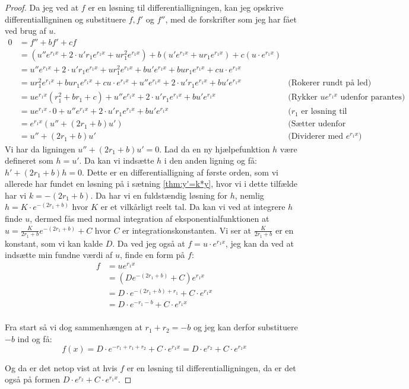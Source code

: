 \begin{proof}
Da jeg ved at $f$ er en løsning til differentialligningen, kan jeg opskrive differentialligninen og substituere $f, f'$ og $f''$, med de forskrifter som jeg har fået ved brug af $u$. 
\begin{align*}
0 	&= f'' + bf' + cf \\
	&= (u''e^{r_1 x} + 2\cdot u' r_1 e^{r_1 x} + u r_1^2 e^{r_1 x}) + b(u'e^{r_1 x} + ur_1 e^{r_1 x}) + c (u \cdot e^{r_1 x})\\
	&= u''e^{r_1 x} + 2\cdot u' r_1 e^{r_1 x} + u r_1^2 e^{r_1 x} + bu'e^{r_1 x} + bur_1 e^{r_1 x} + cu \cdot e^{r_1 x}\\
	&= u r_1^2 e^{r_1 x} + bur_1 e^{r_1 x} + cu \cdot e^{r_1 x} + u''e^{r_1 x} + 2\cdot u' r_1 e^{r_1 x} + bu'e^{r_1 x}  & \text{(Rokerer rundt på led)}\\
	&= ue^{r_1 x}(r_1^2  + br_1 + c) + u''e^{r_1 x} + 2\cdot u' r_1 e^{r_1 x} + bu'e^{r_1 x} & \text{(Rykker $ue^{r_1 x}$ udenfor  parantes)}\\
	&= ue^{r_1 x} \cdot 0+ u''e^{r_1 x} + 2\cdot u' r_1 e^{r_1 x} + bu'e^{r_1 x} & \text{($r_1$ er løsning til karakterligningen)}\\
	&= e^{r_1 x} (u'' + (2r_1 + b)u') & \text{(Sætter udenfor parantes)}\\
	&= u'' + (2r_1 + b)u' & \text{(Dividerer med $e^{r_1 x}$)}
\end{align*}
Vi har da ligningen $u'' + (2r_1 + b)u' = 0$. 
Lad da en ny hjælpefunktion $h$ være defineret som $h = u'$. 
Da kan vi indsætte $h$ i den anden ligning og få:
$h' + (2r_1 + b)h = 0$. 
Dette er en differentialligning af første orden, som vi allerede har fundet en løsning på i sætning \ref{thm:y'=k*y}, 
hvor vi i dette tilfælde har vi $k = -(2r_1 + b)$.
Da har vi en fuldstændig løsning for $h$, nemlig $h=K \cdot e^{-(2r_1 + b)}$ hvor $K$ er et vilkårligt reelt tal. 
Da kan vi ved at integrere $h$ finde $u$, dermed fås med normal integration af eksponentialfunktionen at $u = \frac{K}{2r_1 + b} e^{-(2r_1 + b)} + C$ hvor $C$ er integrationskonstanten. 
Vi ser at $\frac{K}{2r_1 + b}$ er en konstant, som vi kan kalde $D$.
Da ved jeg også at $f=u\cdot e^{r_1 x}$, jeg kan da ved at indsætte min fundne værdi af $u$, finde en form på $f$:
\begin{align*}
f 	&= ue^{r_1 x}\\
	&= (D e^{-(2r_1 + b)} + C)e^{r_1 x} \\
	&= D \cdot e^{-(2r_1 + b)+r_1} + C\cdot e^{r_1 x}\\
	&= D \cdot e^{-r_1 - b} + C\cdot e^{r_1 x}\\
\end{align*}

Fra start så vi dog sammenhængen at $r_1 + r_2 = -b$ og jeg kan derfor substituere $-b$ ind og få:
$$f(x) = D \cdot e^{-r_1 +r_1 + r_2} + C\cdot e^{r_1 x}= D \cdot e^{r_2} + C\cdot e^{r_1 x}$$

Og da er det netop vist at hvis $f$ er en løsning til differentialligningen, da er det også på formen $D \cdot e^{r_2} + C\cdot e^{r_1 x}$.
\end{proof}